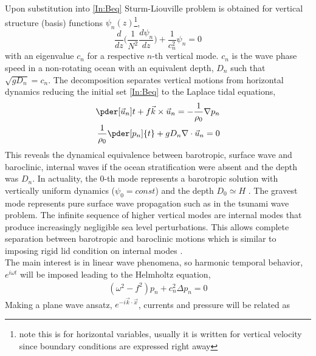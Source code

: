 \documentclass[12pt]{article}
\begin{document}
Upon substitution into \eqref{In:Beq} Sturm-Liouville problem is obtained for vertical structure 
(basis) functions $\psi_n(z)$\footnote{note this is for horizontal variables, usually it is written 
for vertical velocity since boundary conditions are expressed right away},
\begin{equation}
\frac{d}{dz}\big( \frac{1}{N^2} \frac{d \psi_n}{dz} \big) + \frac{1}{c^2_n}\psi_n = 0
\end{equation}
with an eigenvalue $c_n$ for a respective $n$-th vertical mode. $c_n$ is the wave phase speed in a 
non-rotating ocean with an equivalent depth, $D_n$ such that $\sqrt{g D_n} = c_n$. The 
decomposition separates vertical motions from horizontal dynamics reducing the initial set 
\eqref{In:Beq} to the Laplace tidal equations,
\begin{subequations}
\label{In:sweq}
\begin{align}
\pder[\vec{u}_n]{t} + f \vec{k} \times \vec{u}_n = -\frac{1}{\rho_0} \nabla p_n \label{In:swe.mom}\\
\frac{1}{\rho_0} \pder[p_n]{t} + g D_n \nabla  \cdot \vec{u}_n = 0 \label{In:swe.cont}
\end{align}
\end{subequations}
This reveals the dynamical equivalence between barotropic, surface wave and baroclinic, internal 
waves if the ocean stratification were absent and the depth was $D_n$. In actuality, the $0$-th 
mode represents a barotropic solution with vertically uniform dynamics ($\psi_0 = const$) 
and the depth $D_0 \simeq H$ \citep{hendershott1981long}. The gravest mode represents pure surface 
wave propagation such as in the tsunami wave problem. The infinite sequence of higher vertical 
modes are internal modes that produce increasingly negligible sea level perturbations. This allows 
complete separation between barotropic and baroclinic motions which is similar to imposing rigid 
lid condition on internal modes \citep{kundu2008fluid}.\\
The main interest is in linear wave phenomena, so harmonic temporal behavior, $e^{i \omega t}$ 
will be imposed leading to the Helmholtz equation,
\begin{align}
\label{In:helmeq}
(\omega^2 - f^2) p_n + c_n^2 \Delta p_n = 0
\end{align}
Making a plane wave ansatz, $e^{-i\vec{k} \cdot \vec{x}}$, currents and pressure will be related as
\end{document}
